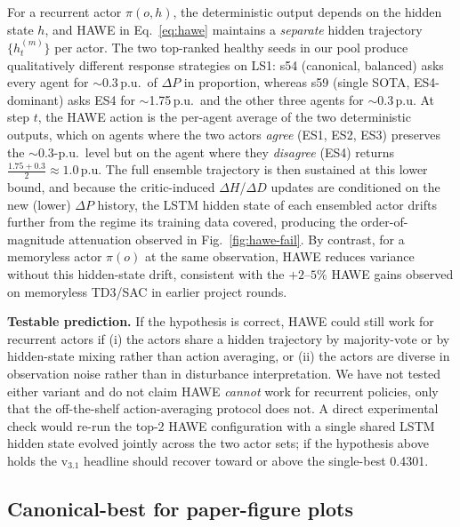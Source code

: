 \documentclass[journal,onecolumn,11pt]{IEEEtran}
\begin{document}
For a recurrent actor $\pi(o, h)$, the deterministic output depends
on the hidden state $h$, and HAWE in Eq.~\ref{eq:hawe} maintains a
\emph{separate} hidden trajectory $\{h^{(m)}_t\}$ per actor. The
two top-ranked healthy seeds in our pool produce qualitatively
different response strategies on LS1: s54 (canonical, balanced)
asks every agent for $\sim$0.3\,p.u.\ of $\Delta P$ in proportion,
whereas s59 (single SOTA, ES4-dominant) asks ES4 for
$\sim$1.75\,p.u.\ and the other three agents for $\sim$0.3\,p.u.
At step $t$, the HAWE action is the per-agent average of the two
deterministic outputs, which on agents where the two actors
\emph{agree} (ES1, ES2, ES3) preserves the $\sim$0.3-p.u.\ level
but on the agent where they \emph{disagree} (ES4) returns
$\frac{1.75 + 0.3}{2} \approx 1.0$\,p.u. The full ensemble
trajectory is then sustained at this lower bound, and because the
critic-induced $\Delta H$/$\Delta D$ updates are conditioned on the
new (lower) $\Delta P$ history, the LSTM hidden state of each
ensembled actor drifts further from the regime its training data
covered, producing the order-of-magnitude attenuation observed in
Fig.~\ref{fig:hawe-fail}. By contrast, for a memoryless actor
$\pi(o)$ at the same observation, HAWE reduces variance without
this hidden-state drift, consistent with the $+2$--$5\%$ HAWE
gains observed on memoryless TD3/SAC in earlier project rounds.

\textbf{Testable prediction.} If the hypothesis is correct, HAWE
could still work for recurrent actors if (i) the actors share a
hidden trajectory by majority-vote or by hidden-state mixing rather
than action averaging, or (ii) the actors are diverse in
observation noise rather than in disturbance interpretation. We
have not tested either variant and do not claim HAWE \emph{cannot}
work for recurrent policies, only that the off-the-shelf
action-averaging protocol does not. A direct experimental check
would re-run the top-2 HAWE configuration with a single shared LSTM
hidden state evolved jointly across the two actor sets; if the
hypothesis above holds the v$_{3.1}$ headline should recover toward
or above the single-best 0.4301.

\subsection{Canonical-best for paper-figure plots}\label{sec:canonical}
\end{document}

